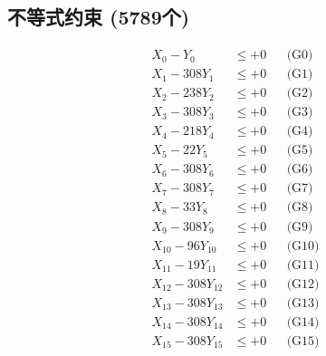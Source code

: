\documentclass[a4paper,10pt]{article}
\begin{document}
\subsection{不等式约束 (5789个)}

\allowdisplaybreaks
{\small
\begin{align}
\allowbreak
\allowbreak
\allowbreak
\allowbreak
\allowbreak
\allowbreak
\allowbreak
\allowbreak
\allowbreak
\allowbreak
\allowbreak
\allowbreak
\allowbreak
\allowbreak
\allowbreak
\allowbreak
\allowbreak
\allowbreak
\allowbreak
\allowbreak
\allowbreak
\allowbreak
\allowbreak
\allowbreak
\allowbreak
\allowbreak
\allowbreak
\allowbreak
\allowbreak
\allowbreak
\allowbreak
\allowbreak
\allowbreak
\allowbreak
\allowbreak
\allowbreak
\allowbreak
\allowbreak
\allowbreak
\allowbreak
\allowbreak
\allowbreak
\allowbreak
\allowbreak
\allowbreak
\allowbreak
\allowbreak
\allowbreak
\allowbreak
\allowbreak
\allowbreak
\allowbreak
\allowbreak
\allowbreak
\allowbreak
\allowbreak
\allowbreak
\allowbreak
\allowbreak
\allowbreak
\allowbreak
\allowbreak
\allowbreak
\allowbreak
\allowbreak
\allowbreak
\allowbreak
\allowbreak
\allowbreak
\allowbreak
\allowbreak
\allowbreak
\allowbreak
\allowbreak
\allowbreak
\allowbreak
\allowbreak
\allowbreak
X_{0} - Y_{0} &\leq +0 && \text{(G0)} \\
\allowbreak
X_{1} - 308Y_{1} &\leq +0 && \text{(G1)} \\
X_{2} - 238Y_{2} &\leq +0 && \text{(G2)} \\
X_{3} - 308Y_{3} &\leq +0 && \text{(G3)} \\
X_{4} - 218Y_{4} &\leq +0 && \text{(G4)} \\
X_{5} - 22Y_{5} &\leq +0 && \text{(G5)} \\
X_{6} - 308Y_{6} &\leq +0 && \text{(G6)} \\
X_{7} - 308Y_{7} &\leq +0 && \text{(G7)} \\
X_{8} - 33Y_{8} &\leq +0 && \text{(G8)} \\
X_{9} - 308Y_{9} &\leq +0 && \text{(G9)} \\
X_{10} - 96Y_{10} &\leq +0 && \text{(G10)} \\
\allowbreak
X_{11} - 19Y_{11} &\leq +0 && \text{(G11)} \\
X_{12} - 308Y_{12} &\leq +0 && \text{(G12)} \\
X_{13} - 308Y_{13} &\leq +0 && \text{(G13)} \\
X_{14} - 308Y_{14} &\leq +0 && \text{(G14)} \\
X_{15} - 308Y_{15} &\leq +0 && \text{(G15)} \\

\end{align}}
\end{document}
